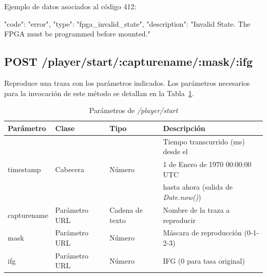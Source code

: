 \begin{itemize}
{\begin{minipage}{\textwidth}
Ejemplo de datos asociados al código 412:

\begin{code}[language=json]
{
  "code": "error",
  "type": "fpga_invalid_state",
  "description": "Invalid State. The FPGA must be programmed before mounted."
}
\end{code}
\end{minipage}
}

\end{itemize}

%
%
\subsection{POST /player/start/:capturename/:mask/:ifg}
Reproduce una \gls{traza} con los parámetros indicados.
Los parámetros necesarios para la invocación de este método se detallan en la Tabla~\ref{extra:api:playerstart:invocacion}.

\begin{table}[H]
\centering
\begin{tabular}{|l|l|l|l|}
\hline
\rowcolor[HTML]{F5F5F5}
\textbf{Parámetro}  & \textbf{Clase} & \textbf{Tipo}   & \textbf{Descripción}                        \\ \hline
                    &                &                 & Tiempo transcurrido (ms) desde el           \\
timestamp           & Cabecera       & Número          & 1 de Enero de 1970 00:00:00 UTC             \\
                    &                &                 & hasta ahora (salida de \textit{Date.now()}) \\ \hline
capturename         & Parámetro URL  & Cadena de texto & Nombre de la \gls{traza} a reproducir       \\ \hline
mask                & Parámetro URL  & Número          & Máscara de reproducción (0-1-2-3)           \\ \hline
ifg                 & Parámetro URL  & Número          & \gls{IFG} (0 para tasa original)            \\ \hline
\end{tabular}
\caption{Parámetros de \textit{/player/start}}
\label{extra:api:playerstart:invocacion}
\end{table}


